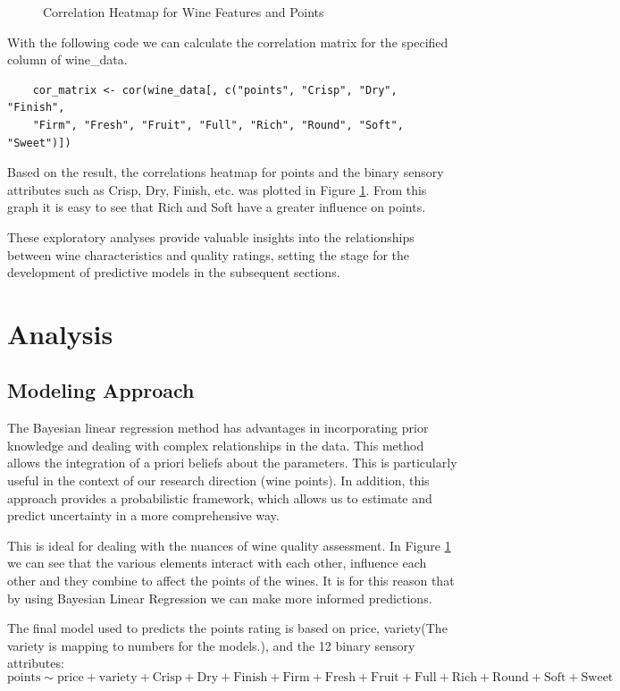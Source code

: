 \documentclass{article}
\begin{document}
\begin{figure}[htbp]
\begin{minipage}{0.45\textwidth}
	\caption{Correlation Heatmap for Wine Features and Points}
	\label{fig:corr_heatmap}
	\end{minipage}
\end{figure}

With the following code we can calculate the correlation matrix for the specified column of wine\_data.
\begin{verbatim}
	cor_matrix <- cor(wine_data[, c("points", "Crisp", "Dry", "Finish", 
	"Firm", "Fresh", "Fruit", "Full", "Rich", "Round", "Soft", "Sweet")])
\end{verbatim}
Based on the result, the correlations heatmap for points and the binary sensory attributes such as Crisp, Dry, Finish, etc. was plotted in Figure \ref{fig:corr_heatmap}. From this graph it is easy to see that Rich and Soft have a greater influence on points.

These exploratory analyses provide valuable insights into the relationships between wine characteristics and quality ratings, setting the stage for the development of predictive models in the subsequent sections.
\section{Analysis}\label{sec:analysis}
\subsection{Modeling Approach}
The Bayesian linear regression method has advantages in incorporating prior knowledge and dealing with complex relationships in the data. This method allows the integration of a priori beliefs about the parameters. This is particularly useful in the context of our research direction (wine points). In addition, this approach provides a probabilistic framework, which allows us to estimate and predict uncertainty in a more comprehensive way. 

This is ideal for dealing with the nuances of wine quality assessment. In Figure \ref{fig:corr_heatmap} we can see that the various elements interact with each other, influence each other and they combine to affect the points of the wines. It is for this reason that by using Bayesian Linear Regression we can make more informed predictions.

The final model used to predicts the points rating is based on price, variety(The variety is mapping to numbers for the models.), and the 12 binary sensory attributes:
\begin{equation*}
	\text{points} \sim \text{price} + \text{variety} + \text{Crisp} + \text{Dry} + \text{Finish} + \text{Firm} + \text{Fresh} + \text{Fruit} + \text{Full} + \text{Rich} + \text{Round} + \text{Soft} + \text{Sweet}
\end{equation*}
\end{document}
